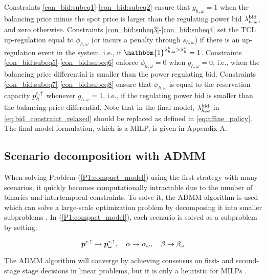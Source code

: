 Constraints \eqref{con_bid:subeq1}-\eqref{con_bid:subeq2} ensure that $g_{h,\omega} = 1$ when the balancing price minus the spot price is larger than the regulating power bid $\lambda^{\rm{bid}}_{h, \omega}$, and zero otherwise. Constraints \eqref{con_bid:subeq3}-\eqref{con_bid:subeq4} set the TCL up-regulation equal to $\phi_{h,\omega}$ (or incurs a penalty through $s_{h,\omega}$) if there is an up-regulation event in the system, i.e., if $\mathbbm{1}^{\lambda^{\rm{b}}_{h,\omega} > \lambda^{\rm{s}}_{h}} = 1$. Constraints \eqref{con_bid:subeq5}-\eqref{con_bid:subeq6} enforce  $\phi_{h,\omega} = 0$ when $g_{h,\omega} = 0$, i.e., when the balancing price differential is smaller than the power regulating bid. Constraints \eqref{con_bid:subeq7}-\eqref{con_bid:subeq8} ensure that $\phi_{h,\omega}$ is equal to the reservation capacity $p^{\rm{r},\uparrow}_{h}$ whenever $g_{h,\omega} = 1$, i.e., if the regulating power bid is smaller than the balancing price differential. Note that in the final model,  $\lambda^{\rm{bid}}_{h, \omega}$ in \eqref{eq:bid_constraint_relaxed} should be replaced as defined in \eqref{eq:affine_policy}. The final model formulation, which is a MILP, is given in Appendix A.

\vspace{-1mm}
\subsection{Scenario decomposition with ADMM}
When solving Problem (\ref{P1:compact_model}) using the first strategy with many scenarios, it quickly becomes computationally intractable due to the number of binaries and intertemporal constraints. To solve it, the ADMM algorithm is used which can solve a large-scale optimization problem by decomposing it into smaller subproblems \cite{boyd2011distributed}. In (\ref{P1:compact_model}), each scenario is solved as a subproblem by setting:

\begin{equation}\label{eq:non_anticipativity}
    \bm{p}^{\rm{r},\uparrow} \rightarrow \bm{p}^{\rm{r},\uparrow}_{\omega}, \quad \alpha \rightarrow \alpha_{\omega}, \quad \beta \rightarrow \beta_{\omega}
\end{equation}

The ADMM algorithm will converge by achieving consensus on first- and second-stage stage decisions in linear problems, but it is only a heuristic for MILPs \cite{hong2016convergence}.
